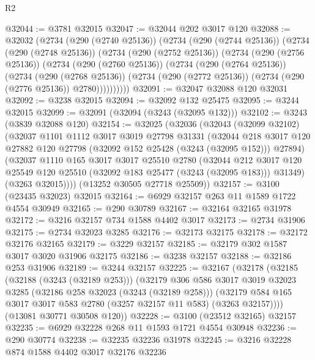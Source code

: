 \begin{lexlean}{R2}
\begin{coremodule}
@32044 := @3781 @32015
@32047 := @32044 @202 @3017 @120
@32088 := @32032
    (@2734
      (@290 (@2740 @25136))
      (@2734
        (@290 (@2744 @25136))
        (@2734
          (@290 (@2748 @25136))
          (@2734
            (@290 (@2752 @25136))
            (@2734
              (@290 (@2756 @25136))
              (@2734
                (@290 (@2760 @25136))
                (@2734
                  (@290 (@2764 @25136))
                  (@2734
                    (@290 (@2768 @25136))
                    (@2734 (@290 (@2772 @25136)) (@2734 (@290 (@2776 @25136)) @2780))))))))))
@32091 := @32047 @32088 @120 @32031
@32092 := @3238 @32015
@32094 := @32092 @132 @25475
@32095 := @3244 @32015
@32099 := @32091 (@32094 (@3243 (@32095 @132)))
@32102 := @3243 (@3839 @32088 @120)
@32154 := @32025
    (@32036
      (@32043
        (@32099 @32102)
        (@32037
          @1101
          @1112
          @3017
          @3019
          @27798
          @31331
          (@32044
            @218
            @3017
            @120
            @27882
            @120
            @27798
            (@32092 @152 @25428 (@3243 (@32095 @152)))
            @27894)
          (@32037
            @1110
            @165
            @3017
            @3017
            @25510
            @2780
            (@32044
              @212
              @3017
              @120
              @25549
              @120
              @25510
              (@32092 @183 @25477 (@3243 (@32095 @183)))
              @31349)
            (@3263 @32015))))
      (@13252 @30505 @27718 @25509))
@32157 := @3100 (@23435 @32023) @32015
@32164 := @6929 @32157 @263 @11 @1589 @1722 @4554 @30949
@32165 := @290 @30789
@32167 := @32164 @32165 @31978
@32172 := @3216 @32157 @734 @1588 @4402 @3017
@32173 := @2734 @31906
@32175 := @2734 @32023 @3285
@32176 := @32173 @32175
@32178 := @32172 @32176 @32165
@32179 := @3229 @32157
@32185 := @32179 @302 @1587 @3017 @3020 @31906 @32175
@32186 := @3238 @32157
@32188 := @32186 @253 @31906
@32189 := @3244 @32157
@32225 := @32167
    (@32178
      (@32185
        (@32188 (@3243 (@32189 @253)))
        (@32179
          @306
          @586
          @3017
          @3019
          @32023
          @3285
          (@32186 @258 @32023 (@3243 (@32189 @258)))
          (@32179 @584 @165 @3017 @3017 @583 @2780 (@3257 @32157 @11 @583) (@3263 @32157))))
      (@13081 @30771 @30508 @120))
@32228 := @3100 (@23512 @32165) @32157
@32235 := @6929 @32228 @268 @11 @1593 @1721 @4554 @30948
@32236 := @290 @30774
@32238 := @32235 @32236 @31978
@32245 := @3216 @32228 @874 @1588 @4402 @3017 @32176 @32236

\end{coremodule}
\end{lexlean}
